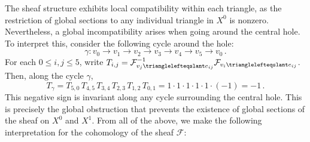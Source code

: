 \documentclass[reqno,12pt]{amsart}
\newcommand{\face}{{\trianglelefteqslant}}
\newcommand{\cF}{{\mathcal F}}
\newcommand{\0}{\mathbf 0}
\theoremstyle{definition}
\begin{document}
The sheaf structure exhibits local compatibility within each triangle, as the restriction of global sections to any individual triangle in $X^0$ is nonzero. Nevertheless, a global incompatibility arises when going around the central hole. To interpret this, consider the following cycle around the hole:
\[
\gamma\colon v_0\to v_1\to v_2\to v_3\to v_4\to v_5 \to v_0\,.
\]
For each $0\leq i,j\leq 5$, write $T_{i,j}=\cF_{v_j\face e_{ij}}^{-1}\cF_{v_i\face e_{ij}}$. Then, along the cycle $\gamma$,
\[
T_{\gamma}=T_{5,0}\,T_{4,5}\,T_{3,4}\,T_{2,3}\,T_{1,2}\,T_{0,1}=1\cdot 1\cdot 1\cdot 1\cdot 1\cdot (-1)=-1\,.
\]
This negative sign is invariant along any cycle surrounding the central hole. This is precisely the global obstruction that prevents the existence of global sections of the sheaf on $X^0$ and $X^1$. From all of the above, we make the following interpretation for the cohomology of the sheaf $\cF$:
\end{document}
